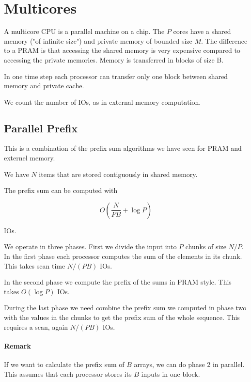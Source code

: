\section{Multicores}

A multicore CPU is a parallel machine on a chip. The $P$ cores have a shared memory ("of infinite size") and private memory of bounded size $M$. The difference to a PRAM is that accessing the shared memory is very expensive compared to accessing the private memories. Memory is transferred in blocks of size B.

In one time step each processor can transfer only one block between shared memory and private cache.

We count the number of IOs, as in external memory computation.

\subsection{Parallel Prefix}

This is a combination of the prefix sum algorithms we have seen for PRAM and externel memory.

We have $N$ items that are stored contiguously in shared memory. 

\begin{thm} The prefix sum can be computed with 

\[O(\frac{N}{PB} + \log P)\]

IOs.
\end{thm}

\begin{pr} We operate in three phases. First we divide the input into $P$ chunks of size $N/P$. In the first phase each processor computes the sum of the elements in its chunk. This takes scan time $N/(PB)$ IOs.

In the second phase we compute the prefix of the sums in PRAM style. This takes $O(\log P)$ IOs.

During the last phase we need combine the prefix sum we computed in phase two with the values in the chunks to get the prefix sum of the whole sequence. This requires a scan, again $N/(PB)$ IOs.
\end{pr}

\paragraph{Remark} If we want to calculate the prefix sum of $B$ arrays, we can do phase 2 in parallel. This assumes that each processor stores its $B$ inputs in one block.

